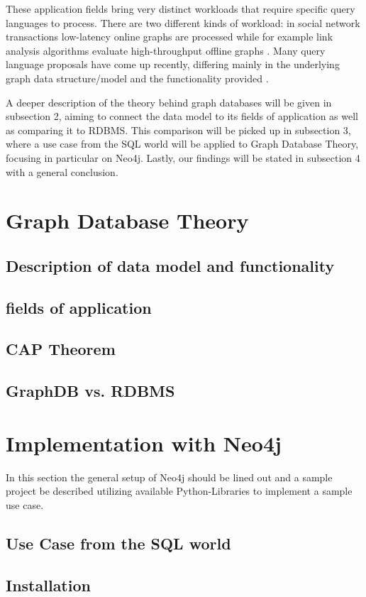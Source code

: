 These application fields bring very distinct workloads that require specific query languages to process. There are two different kinds of workload: in social network transactions low-latency online graphs are processed while for example link analysis algorithms evaluate high-throughput offline graphs \cite{Angles2018AnIT}. Many query language proposals have come up recently, differing mainly in the underlying graph data structure/model and the functionality provided \cite{Wood2012QueryLF}.

A deeper description of the theory behind graph databases will be given in subsection 2, aiming to connect the data model to its fields of application as well as comparing it to RDBMS. This comparison will be picked up in subsection 3, where a use case from the SQL world will be applied to Graph Database Theory, focusing in particular on Neo4j. Lastly, our findings will be stated in subsection 4 with a general conclusion.


\section{Graph Database Theory}
\subsection{Description of data model and functionality}
\subsection{fields of application}
\subsection{CAP Theorem}
\subsection{GraphDB vs. RDBMS}

\section{Implementation with Neo4j}
In this section the general setup of Neo4j should be lined out and a sample project be described utilizing available Python-Libraries to implement a sample use case.
\subsection{Use Case from the SQL world}
\subsection{Installation}
